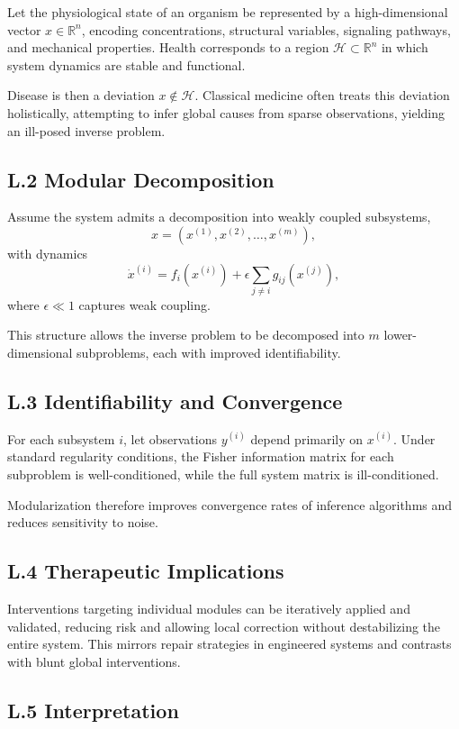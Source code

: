 \documentclass[11pt]{article}
\begin{document}
Let the physiological state of an organism be represented by a high-dimensional vector \(x \in \mathbb{R}^n\), encoding concentrations, structural variables, signaling pathways, and mechanical properties. Health corresponds to a region \(\mathcal{H} \subset \mathbb{R}^n\) in which system dynamics are stable and functional.

Disease is then a deviation \(x \notin \mathcal{H}\). Classical medicine often treats this deviation holistically, attempting to infer global causes from sparse observations, yielding an ill-posed inverse problem.

\subsection{L.2 Modular Decomposition}

Assume the system admits a decomposition into weakly coupled subsystems,
\[
x = (x^{(1)}, x^{(2)}, \ldots, x^{(m)}),
\]
with dynamics
\[
\dot{x}^{(i)} = f_i(x^{(i)}) + \epsilon \sum_{j \neq i} g_{ij}(x^{(j)}),
\]
where \(\epsilon \ll 1\) captures weak coupling.

This structure allows the inverse problem to be decomposed into \(m\) lower-dimensional subproblems, each with improved identifiability.

\subsection{L.3 Identifiability and Convergence}

For each subsystem \(i\), let observations \(y^{(i)}\) depend primarily on \(x^{(i)}\). Under standard regularity conditions, the Fisher information matrix for each subproblem is well-conditioned, while the full system matrix is ill-conditioned.

Modularization therefore improves convergence rates of inference algorithms and reduces sensitivity to noise.

\subsection{L.4 Therapeutic Implications}

Interventions targeting individual modules can be iteratively applied and validated, reducing risk and allowing local correction without destabilizing the entire system. This mirrors repair strategies in engineered systems and contrasts with blunt global interventions.

\subsection{L.5 Interpretation}
\end{document}

